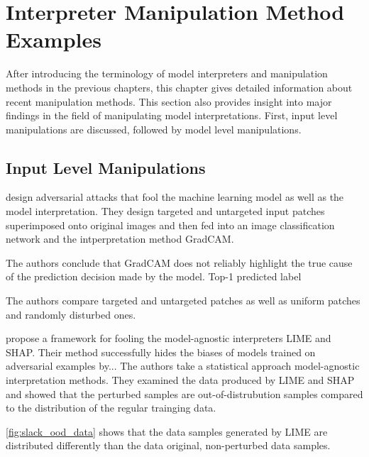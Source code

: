 \section{Interpreter Manipulation Method Examples}
\label{sec:manipulations}

After introducing the terminology of model interpreters and manipulation methods in the previous chapters, this chapter gives detailed information about recent manipulation methods. This section also provides insight into major findings in the field of manipulating model interpretations. First, input level manipulations are discussed, followed by model level manipulations. 

\subsection{Input Level Manipulations}

\newline
\cite{subramanya2019fooling} design adversarial attacks that fool the machine learning model as well as the model interpretation. 
They design targeted and untargeted input patches superimposed onto original images and then fed into an image classification network and the intperpretation method GradCAM. 

The authors conclude that GradCAM does not reliably highlight the true cause of the prediction decision made by the model. 
Top-1 predicted label 

The authors compare targeted and untargeted patches as well as uniform patches and randomly disturbed ones. 


\newline
\cite{advlime_aies20} propose a framework for fooling the model-agnostic interpreters LIME and SHAP. Their method successfully hides the biases of models trained on adversarial examples by... 
The authors take a statistical approach model-agnostic interpretation methods. They examined the data produced by LIME and SHAP and showed that the perturbed samples are out-of-distrubution samples compared to the distribution of the regular trainging data. 

\autoref{fig:slack_ood_data} shows that the data samples generated by LIME are distributed differently than the data original, non-perturbed data samples. 

